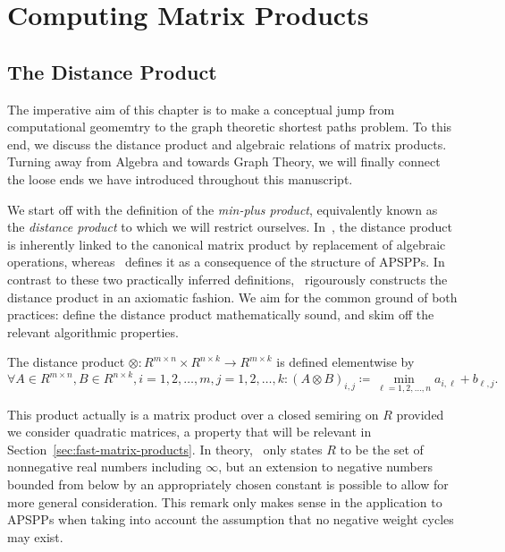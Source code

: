 \chapter{Computing Matrix Products}\label{chap:matrix-products}

\section{The Distance Product}\label{sec:dist-prod}

The imperative aim of this chapter is to make a conceptual jump from computational geomemtry to the graph theoretic shortest paths problem.
To this end, we discuss the distance product and algebraic relations of matrix products.
Turning away from Algebra and towards Graph Theory, we will finally connect the loose ends we have introduced throughout this manuscript.

We start off with the definition of the \emph{min-plus product}, equivalently known as the \emph{distance product} to which we will restrict ourselves.
In~\cite[Chapter~25]{Cormen2001}, the distance product is inherently linked to the canonical matrix product by replacement of algebraic operations, whereas~\cite{Chan2007} defines it as a consequence of the structure of APSPPs.
In contrast to these two practically inferred definitions,\ \cite[Section~5.6]{Aho1974} rigourously constructs the distance product in an axiomatic fashion.
We aim for the common ground of both practices: define the distance product mathematically sound, and skim off the relevant algorithmic properties.

\begin{definition}\label{def:distance-product}
    The distance product $\otimes: R^{m \times n} \times R^{n \times k} \rightarrow R^{m \times k}$ is defined elementwise by
    \[
        \forall A \in R^{m \times n}, B \in R^{n \times k}, i = 1, 2, \dots, m, j = 1, 2, \dots, k: {\left( A \otimes B \right)}_{i, j} \coloneqq \min\limits_{\ell = 1, 2, \dots, n} a_{i, \ell} + b_{\ell, j}.
    \]
\end{definition}

This product actually is a matrix product over a closed semiring on $R$ provided we consider quadratic matrices, a property that will be relevant in Section~\ref{sec:fast-matrix-products}.
In theory,\ \cite[Example~5.9]{Aho1974} only states $R$ to be the set of nonnegative real numbers including $\infty$, but an extension to negative numbers bounded from below by an appropriately chosen constant is possible to allow for more general consideration.
This remark only makes sense in the application to APSPPs when taking into account the assumption that no negative weight cycles may exist.

